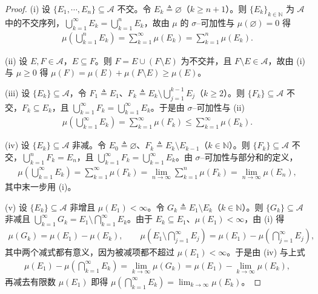 \documentclass[../../main.tex]{subfiles}%
\begin{document}
\begin{proof}
(i) 设 $\{E_1,\cdots ,E_n\}\subseteq\mathcal{A}$ 不交。令 $E_k\triangleq\varnothing$（$k\geqslant n+1$）。则 $\{E_k\}_{k\in\mathbb{N}}$ 为 $\mathcal{A}$ 中的不交序列，$\bigcup_{k=1}^\infty E_k=\bigcup_{k=1}^nE_k$，故由 $\mu$ 的 $\sigma$--可加性与 $\mu(\varnothing )=0$ 得
\begin{align*}
\mu\left(\bigcup_{k=1}^nE_k\right)=\sum_{k=1}^\infty\mu(E_k)=\sum_{k=1}^n\mu(E_k).
\end{align*}

(ii) 设 $E,F\in\mathcal{A}$，$E\subseteq F$。则 $F=E\cup(F\setminus E)$ 为不交并，且 $F\setminus E\in\mathcal{A}$，故由 (i) 与 $\mu\geqslant0$ 得 $\mu(F)=\mu(E)+\mu(F\setminus E)\geqslant\mu(E)$。

(iii) 设 $\{E_k\}\subseteq\mathcal{A}$，令 $F_1\triangleq E_1$、$F_k\triangleq E_k\setminus\bigcup_{j=1}^{k-1}E_j$（$k\geqslant2$）。则 $\{F_k\}\subseteq\mathcal{A}$ 不交，$F_k\subseteq E_k$，且 $\bigcup_{k=1}^\infty F_k=\bigcup_{k=1}^\infty E_k$。于是由 $\sigma$--可加性与 (ii)
\begin{align*}
\mu\left(\bigcup_{k=1}^\infty E_k\right)=\sum_{k=1}^\infty\mu(F_k)\leqslant\sum_{k=1}^\infty\mu(E_k).
\end{align*}

(iv) 设 $\{E_k\}\subseteq\mathcal{A}$ 非减。令 $E_0\triangleq\varnothing$、$F_k\triangleq E_k\setminus E_{k-1}$（$k\in\mathbb{N}$）。则 $\{F_k\}\subseteq\mathcal{A}$ 不交，$\bigcup_{k=1}^nF_k=E_n$，且 $\bigcup_{k=1}^\infty F_k=\bigcup_{k=1}^\infty E_k$。由 $\sigma$--可加性与部分和的定义，
\begin{align*}
\mu\left(\bigcup_{k=1}^\infty E_k\right)=\sum_{k=1}^\infty\mu(F_k)=\lim_{n\to\infty}\sum_{k=1}^n\mu(F_k)=\lim_{n\to\infty}\mu(E_n),
\end{align*}
其中末一步用 (i)。

(v) 设 $\{E_k\}\subseteq\mathcal{A}$ 非增且 $\mu(E_1)<\infty$。令 $G_k\triangleq E_1\setminus E_k$（$k\in\mathbb{N}$）。则 $\{G_k\}\subseteq\mathcal{A}$ 非减且 $\bigcup_{k=1}^\infty G_k=E_1\setminus\bigcap_{k=1}^\infty E_k$。由于 $E_k\subseteq E_1$、$\mu(E_1)<\infty$，由 (i) 得
\begin{align*}
\mu(G_k)=\mu(E_1)-\mu(E_k),\qquad\mu\left(E_1\setminus\bigcap_{j=1}^\infty E_j\right)=\mu(E_1)-\mu\left(\bigcap_{j=1}^\infty E_j\right),
\end{align*}
其中两个减式都有意义，因为被减项都不超过 $\mu(E_1)<\infty$。于是由 (iv) 与上式
\begin{align*}
\mu(E_1)-\mu\left(\bigcap_{k=1}^\infty E_k\right)=\lim_{k\to\infty}\mu(G_k)=\mu(E_1)-\lim_{k\to\infty}\mu(E_k),
\end{align*}
再减去有限数 $\mu(E_1)$ 即得 $\mu\left(\bigcap_{k=1}^\infty E_k\right)=\lim_{k\to\infty}\mu(E_k)$。
\end{proof}
\end{document}
